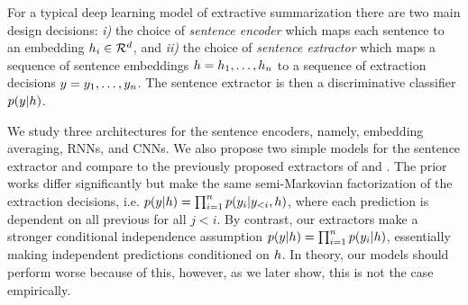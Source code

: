 

For a typical deep learning model of extractive 
summarization there are two main design decisions:
\textit{i)}  the choice of \textit{sentence encoder} 
which maps each sentence \sent[i] 
to an embedding $\sentEmb[i] \in \mathcal{R}^{\sentEmbSize}$, 
and 
\textit{ii)} the choice of \textit{sentence extractor} 
which maps a sequence of sentence embeddings 
$\sentEmb = \sentEmb[1],\ldots, \sentEmb[\docSize]$  
to a sequence of extraction
decisions $\slabel = \slabel_1,\ldots,\slabel_{\docSize}$.
The sentence extractor is then a discriminative 
classifier $p(\slabel | \sentEmb)$.

We study three architectures for the sentence encoders, namely, 
embedding averaging, RNNs, and 
CNNs.
We also propose two simple models for the sentence extractor and compare
to the previously proposed extractors of 
\citet{cheng2016neural} and \citet{nallapati2017summarunner}.
The prior works differ significantly but make the same semi-Markovian
factorization of the extraction decisions, i.e. 
$p(\slabel|\sentEmb)=\prod_{i=1}^\docSize p(\slabel[i]|\slabel[<i],\sentEmb)$,
where each prediction \slabel[i] is dependent on all previous \slabel[j] for
all $j < i$.
By contrast, our extractors make a stronger conditional independence 
assumption $p(\slabel|\sentEmb)=\prod_{i=1}^\docSize p(\slabel[i]|\sentEmb)$,
essentially making independent predictions conditioned on $\sentEmb$.
In theory, our models should perform worse because of this, however, as
we later show, this is not the case empirically.



